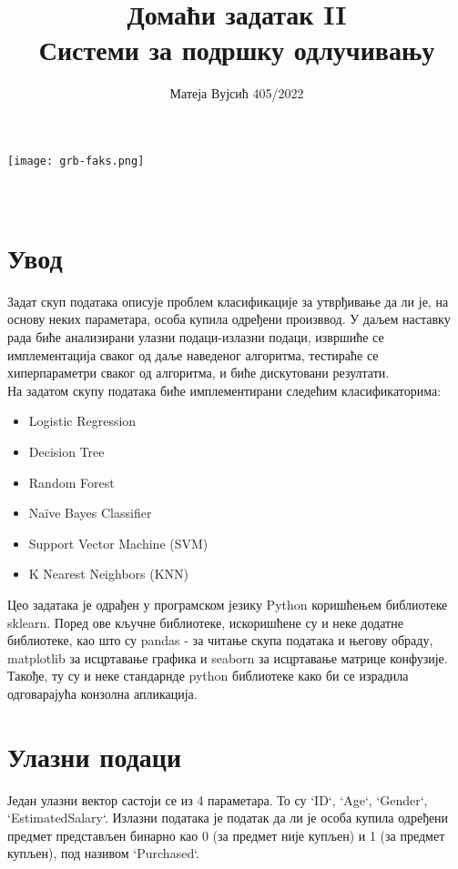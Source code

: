 \documentclass[11pt]{article} %
\title{Домаћи задатак II \\  Системи за подршку одлучивању}
\author{Матеја Вујсић 405/2022}
\begin{document}
\makeatletter
    \begin{titlepage}
        \begin{center}
            \texttt{[image: grb-faks.png]}\\[7ex]
            {\huge \bfseries  \@title }\\[2ex] 
            {\LARGE  \@author}\\[50ex] 
            {\large \@date}
        \end{center}
    \end{titlepage}
\makeatother
\thispagestyle{empty}
\newpage
\newpage

\doublespacing
\tableofcontents
\singlespacing

\newpage
\section{Увод}
Задат скуп података описује проблем класификације за утврђивање да ли је, на основу неких параметара, особа купила одређени произввод. У даљем наставку рада биће анализирани улазни подаци-излазни подаци, извршиће се имплементација сваког од даље наведеног алгоритма, тестираће се хиперпараметри сваког од алгоритма, и биће дискутовани резултати. \\
На задатом скупу података биће имплементирани следећим класификаторима:
\begin{itemize}
	\item Logistic Regression
	\item Decision Tree
	\item Random Forest
	\item Naïve Bayes Classifier
	\item Support Vector Machine (SVM)
	\item K Nearest Neighbors (KNN)
\end{itemize}

Цео задатака је одрађен у програмском језику Python коришћењем библиотеке sklearn. Поред ове кључне библиотеке, искоришћене су и неке додатне библиотеке, као што су pandas - за читање скупа података и његову обраду, matplotlib за исцртавање графика и seaborn за исцртавање матрице конфузије. Такође, ту су и неке стандарнде python библиотеке како би се израдила одговарајућа конзолна апликација.

\newpage

\section{Улазни подаци}
Један улазни вектор састоји се из 4 параметара. То су `ID`, `Age`, `Gender`,
 `EstimatedSalary`. 
Излазни података је податак да ли је особа купила одређени предмет представљен бинарно као 0 (за предмет није купљен) и 1 (за предмет купљен), под називом  `Purchased`.
\end{document}
